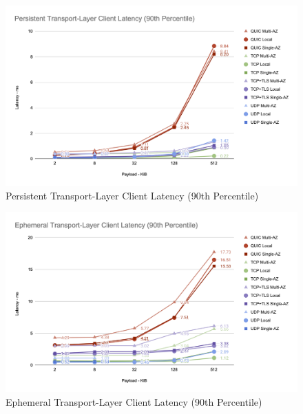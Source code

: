 \clearpage

\begin{figure}[h!]
    \centering
    \includegraphics[width=\linewidth]{figures/charts/Persistent Transport-Layer Client Latency (90th Percentile).png}
    \caption{Persistent Transport-Layer Client Latency (90th Percentile)}
    \label{fig:persistent_transport_latency}
\end{figure}

\begin{figure}[h!]
    \centering
    \includegraphics[width=\linewidth]{figures/charts/Ephemeral Transport-Layer Client Latency (90th Percentile).png}
    \caption{Ephemeral Transport-Layer Client Latency (90th Percentile)}
    \label{fig:ephemeral_transport_latency}
\end{figure}

